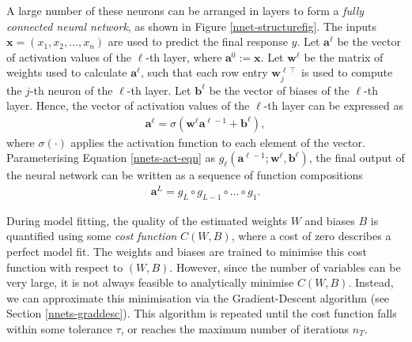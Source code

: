 A large number of these neurons can be arranged in layers to form a \textit{fully connected neural network}, as shown in Figure \ref{nnet-structurefig}. The inputs $\mathbf{x} = (x_1, x_2, \ldots, x_n)$ are used to predict the final response $y$. Let $\mathbf{a}^\ell$ be the vector of activation values of the $\ell$-th layer, where $\mathbf{a}^0 := \mathbf{x}$. Let $\mathbf{w}^\ell$ be the matrix of weights used to calculate $\mathbf{a}^\ell$, such that each row entry $\mathbf{w}_j^{\ell\intercal}$ is used to compute the $j$-th neuron of the $\ell$-th layer. Let $\mathbf{b}^\ell$ be the vector of biases of the $\ell$-th layer. Hence, the vector of activation values of the $\ell$-th layer can be expressed as
\begin{align}\label{nnets-act-eqn}
	\mathbf{a}^\ell = \sigma(\mathbf{w}^\ell \mathbf{a}^{\ell - 1} + \mathbf{b}^\ell),
\end{align}
where $\sigma(\cdot)$ applies the activation function to each element of the vector. Parameterising Equation \eqref{nnets-act-eqn} as $g_\ell(\mathbf{a}^{\ell - 1}; \mathbf{w}^\ell, \mathbf{b}^\ell)$, the final output of the neural network can be written as a sequence of function compositions
\begin{align*}
	\mathbf{a}^L = g_L \circ g_{L-1} \circ \ldots \circ g_1.
\end{align*}



During model fitting, the quality of the estimated weights $W$ and biases $B$ is quantified using some \textit{cost function} $C(W,B)$, where a cost of zero describes a perfect model fit. The weights and biases are trained to minimise this cost function with respect to $(W,B)$. However, since the number of variables can be very large, it is not always feasible to analytically minimise $C(W,B)$. Instead, we can approximate this minimisation via the Gradient-Descent algorithm (see Section \ref{nnets-graddesc}). This algorithm is repeated until the cost function falls within some tolerance $\tau$, or reaches the maximum number of iterations $n_T$.



